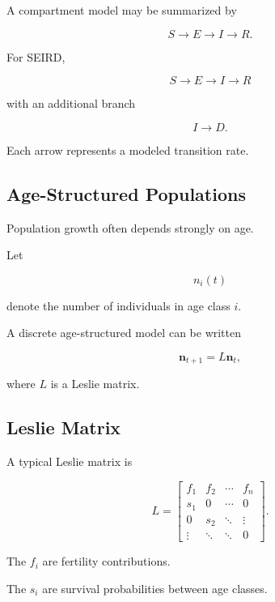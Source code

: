 A compartment model may be summarized by

\[
\boxed{
S
\longrightarrow
E
\longrightarrow
I
\longrightarrow
R.
}
\]

For SEIRD,

\[
\boxed{
S
\longrightarrow
E
\longrightarrow
I
\longrightarrow
R
}
\]

with an additional branch

\[
\boxed{
I
\longrightarrow
D.
}
\]

Each arrow represents a modeled transition rate.

\subsection{Age-Structured Populations}
\label{subsec:age-structured-populations}

Population growth often depends strongly on age.

Let

\[
n_i(t)
\]

denote the number of individuals in age class \(i\).

A discrete age-structured model can be written

\[
\boxed{
\mathbf{n}_{t+1}
=
L\mathbf{n}_t,
}
\]

where \(L\) is a Leslie matrix.

\subsection{Leslie Matrix}
\label{subsec:leslie-matrix}

A typical Leslie matrix is

\[
\boxed{
L
=
\begin{bmatrix}
f_1 & f_2 & \cdots & f_n\\
s_1 & 0 & \cdots & 0\\
0 & s_2 & \ddots & \vdots\\
\vdots & \ddots & \ddots & 0
\end{bmatrix}.
}
\]

The \(f_i\) are fertility contributions.

The \(s_i\) are survival probabilities between age classes.


